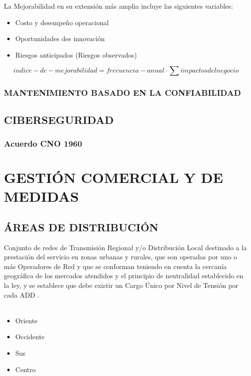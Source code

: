 \documentclass[a5paper]{book}%
\begin{document}
La Mejorabilidad en su extensión más amplia incluye las siguientes variables:

\begin{itemize}
\item Costo y desempeño operacional
\item Oportunidades des innovación
\item Riesgos anticipados (Riesgos observados)
\end{itemize}

\[ indice-de-mejorabilidad = frecuencia-anual \cdot \sum impactos del negocio\]


\section{MANTENIMIENTO BASADO EN LA CONFIABILIDAD}


\chapter{CIBERSEGURIDAD}

\section{Acuerdo CNO 1960}

\part{GESTIÓN COMERCIAL Y DE MEDIDAS}

\chapter{ÁREAS DE DISTRIBUCIÓN}
Conjunto de redes de Transmisión Regional y/o Distribución Local
destinado a la prestación del servicio en zonas urbanas y rurales, que
son operadas por uno o más Operadores de Red y que se conforman
teniendo en cuenta la cercanía geográfica de los mercados atendidos y
el principio de neutralidad establecido en la ley, y se establece que
debe existir un Cargo Único por Nivel de Tensión por cada ADD \cite{CREG1332013}.\\\\
\begin{itemize}
\item Oriente
\item  Occidente
\item  Sur 
\item  Centro
\end{itemize}
\end{document}
